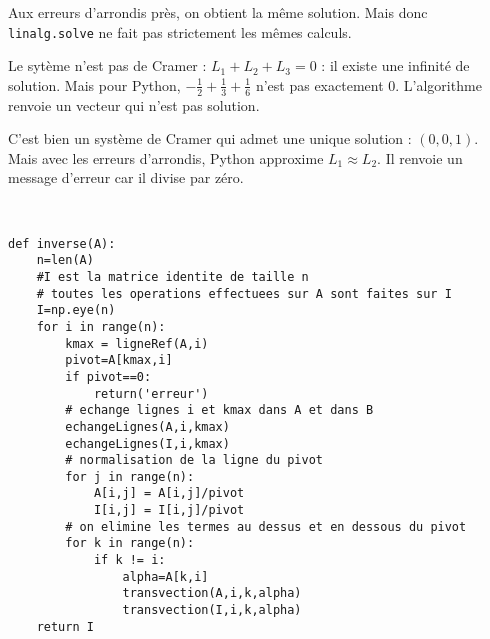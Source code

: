 \setcounter{solution}{5}

\begin{solution}
Aux erreurs d'arrondis pr\` es, on obtient la m\^ eme solution. Mais donc \verb?linalg.solve? ne fait pas strictement les m\^ emes calculs.
\end{solution}

\begin{solution}
Le syt\` eme n'est pas de Cramer : $L_1+L_2+L_3=0$ : il existe une infinit\' e de solution. Mais pour Python, $-\frac{1}{2}+\frac{1}{3}+\frac{1}{6}$ n'est pas exactement 0. L'algorithme renvoie un vecteur qui n'est pas solution.
\end{solution}

\begin{solution}
C'est bien un syst\` eme de Cramer qui admet une unique solution : $(0,0,1)$. Mais avec les erreurs d'arrondis, Python approxime $L_1\approx L_2$. Il renvoie un message d'erreur car il divise par z\' ero.
\end{solution}


\begin{solution}~\\
\vspace*{-0.7cm}
\begin{verbatim}
def inverse(A):
    n=len(A)
    #I est la matrice identite de taille n
    # toutes les operations effectuees sur A sont faites sur I
    I=np.eye(n)
    for i in range(n):
        kmax = ligneRef(A,i)
        pivot=A[kmax,i]   
        if pivot==0:
            return('erreur')
        # echange lignes i et kmax dans A et dans B
        echangeLignes(A,i,kmax)
        echangeLignes(I,i,kmax)
        # normalisation de la ligne du pivot
        for j in range(n):
            A[i,j] = A[i,j]/pivot   
            I[i,j] = I[i,j]/pivot
        # on elimine les termes au dessus et en dessous du pivot
        for k in range(n):
            if k != i:
                alpha=A[k,i]
                transvection(A,i,k,alpha)  
                transvection(I,i,k,alpha)       
    return I
\end{verbatim}
\end{solution}

